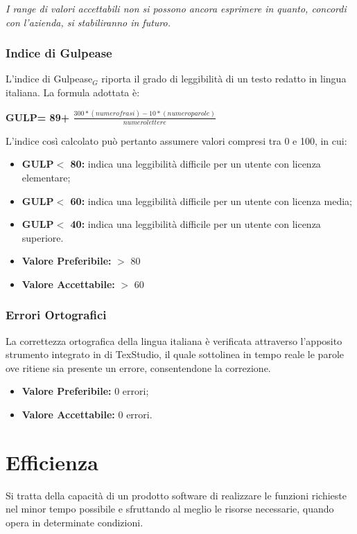 \textit{I range di valori accettabili non si possono ancora esprimere in quanto, concordi con l'azienda, si stabiliranno in futuro.}
\subsubsection{Indice di Gulpease} \label{QualitàDelProdottoUsabilitàMetricheIndiceDiGulpease}
L’indice di Gulpease$_G$ riporta il grado di leggibilità di un testo redatto in lingua italiana.
La formula adottata è:
\begin{center}
	\textbf{GULP= 89+ $\frac{300*(numero frasi)-10*(numero parole)}{numero lettere}$}
\end{center}
L'indice così calcolato può pertanto assumere valori compresi tra 0 e 100, in cui:
\begin{itemize}
	\item \textbf{GULP$<$ 80:} indica una leggibilità difficile per un utente con licenza elementare;
	\item \textbf{GULP$<$ 60:} indica una leggibilità difficile per un utente con licenza media;
	\item \textbf{GULP$<$ 40:} indica una leggibilità difficile per un utente con licenza superiore.
\end{itemize}
\begin{itemize}
	\item \textbf{Valore Preferibile:} $>$ 80 
	\item \textbf{Valore  Accettabile:} $>$ 60
\end{itemize}
\subsubsection{Errori Ortografici} \label{QualitàDelProdottoUsabilitàMetricheErroriOrtografici}
La correttezza ortografica della lingua italiana è verificata attraverso l’apposito strumento integrato in di TexStudio, il quale sottolinea in tempo reale le parole ove ritiene sia presente un errore, consentendone la correzione.
\begin{itemize}
	\item \textbf{Valore Preferibile:} 0 errori;
	\item \textbf{Valore  Accettabile:} 0 errori.
\end{itemize}

\section{Efficienza} \label{QualitàDelProdottoEfficienza}
Si tratta della capacità di un prodotto software di realizzare le funzioni richieste nel minor tempo possibile e sfruttando al meglio le risorse necessarie, quando opera in determinate condizioni. 
